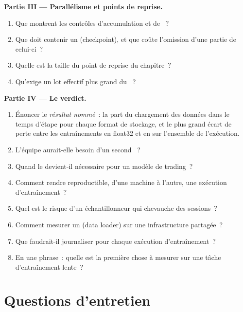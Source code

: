 \begin{problem}
\medskip\noindent\textbf{Partie III --- Parallélisme et points de reprise.}
\begin{enumerate}[resume]
\item Que montrent les contrôles d'accumulation et de ~?
\item Que doit contenir un  (checkpoint), et que coûte l'omission d'une partie de celui-ci~?
\item Quelle est la taille du point de reprise du chapitre~?
\item Qu'exige un lot effectif plus grand du ~?
\end{enumerate}

\medskip\noindent\textbf{Partie IV --- Le verdict.}
\begin{enumerate}[resume]
\item Énoncer le \emph{résultat nommé}~: la part du chargement des données dans le temps d'étape pour chaque format de stockage, et le plus grand écart de perte
entre les entraînements en float32 et en  sur l'ensemble de l'exécution.
\item L'équipe aurait-elle besoin d'un second ~?
\item Quand le  devient-il nécessaire pour un modèle de trading~?
\item Comment rendre reproductible, d'une machine à l'autre, une exécution d'entraînement~?
\item Quel est le risque d'un échantillonneur qui chevauche des sessions~?
\item Comment mesurer un  (data loader) sur une infrastructure partagée~?
\item Que faudrait-il journaliser pour chaque exécution d'entraînement~?
\item En une phrase~: quelle est la première chose à mesurer sur une tâche d'entraînement lente~?
\end{enumerate}
\end{problem}

\section{Questions d'entretien}

